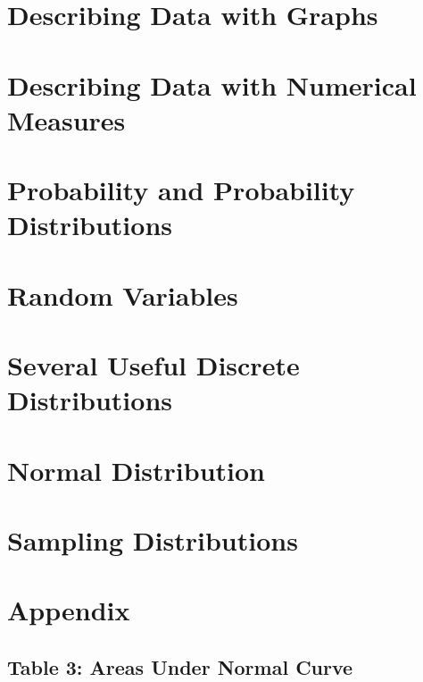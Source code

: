 \documentclass{package/notes}
\begin{document}
\chapter{Describing Data with Graphs}



\chapter{Describing Data with Numerical Measures}


\chapter{Probability and Probability Distributions}


\chapter{Random Variables}



\chapter{Several Useful Discrete Distributions}



\chapter{Normal Distribution}



\chapter{Sampling Distributions}



\chapter{Appendix}

\section{Table 3: Areas Under Normal Curve}
\end{document}
